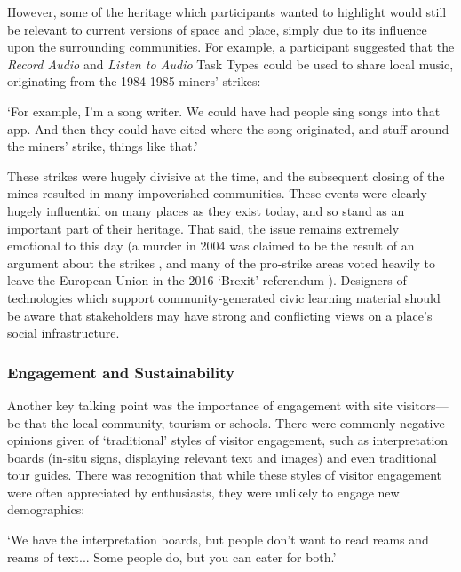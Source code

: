However, some of the heritage which participants wanted to highlight would still be relevant to current versions of space and place, simply due to its influence upon the surrounding communities. For example, a participant suggested that the \textit{Record Audio} and \textit{Listen to Audio} Task Types could be used to share local music, originating from the 1984-1985 miners' strikes:

\begin{displayquote}
`For example, I'm a song writer. We could have had people sing songs into that app. And then they could have cited where the song originated, and stuff around the miners' strike, things like that.'
\end{displayquote}

These strikes were hugely divisive at the time, and the subsequent closing of the mines resulted in many impoverished communities. These events were clearly hugely influential on many places as they exist today, and so stand as an important part of their heritage. That said, the issue remains extremely emotional to this day (a murder in 2004 was claimed to be the result of an argument about the strikes \citep{theindependent_2004}, and many of the pro-strike areas voted heavily to leave the European Union in the 2016 `Brexit' referendum \citep{dailypost_2017}). Designers of technologies which support community-generated civic learning material should be aware that stakeholders may have strong and conflicting views on a place's social infrastructure. 

\subsubsection{Engagement and Sustainability}

Another key talking point was the importance of engagement with site visitors---be that the local community, tourism or schools. There were commonly negative opinions given of `traditional' styles of visitor engagement, such as interpretation boards (in-situ signs, displaying relevant text and images) and even traditional tour guides. There was recognition that while these styles of visitor engagement were often appreciated by enthusiasts, they were unlikely to engage new demographics:

\begin{displayquote}
`We have the interpretation boards, but people don't want to read reams and reams of text... Some people do, but you can cater for both.'
\end{displayquote}

